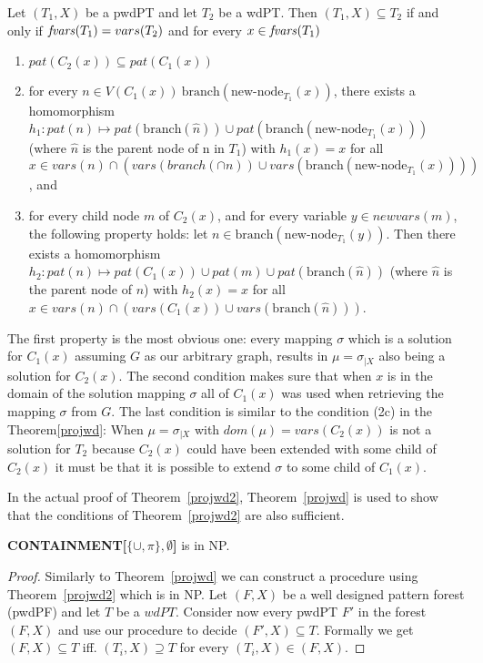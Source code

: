 \begin{theorem}\label{projwd2}
	Let $(T_1,X)$ be a pwdPT and let $T_2$ be a wdPT. Then $(T_1,X) \subseteq
	T_2$ if and only if $\mathit{fvars}(T_1) = vars(T_2)$ and for every $x \in
	\mathit{fvars}(T_1)$
	\begin{enumerate}
		\item $pat(C_2(x)) \subseteq pat(C_1(x))$
		\item for every $n \in V(C_1(x)) \ \mbox{branch} (\mbox{new-node}_{T_1}(x))$, there
			exists a homomorphism $h_1: pat(n) \mapsto pat(\mbox{branch}(\hat{n})) \cup
			pat(\mbox{branch}(\mbox{new-node}_{T_1}(x)))$ (where $\hat{n}$ is the parent node
			of n in $T_1$) with $h_1(x) = x$ for all $x \in vars(n) \cap
			(vars(branch(\cap{n})) \cup vars(\mbox{branch}(\mbox{new-node}_{T_1}(x))))$, and
		\item for every child node $m$ of $C_2(x)$, and for every variable $y
			\in newvars(m)$, the following property holds: let $n \in
			\mbox{branch}(\mbox{new-node}_{T_1}(y))$. Then there exists a homomorphism
			$h_2:pat(n) \mapsto pat(C_1(x)) \cup pat(m) \cup
			pat(\mbox{branch}(\hat{n}))$ (where $\hat{n}$ is the parent node of $n$)
			with $h_2(x) = x$ for all $x \in vars(n) \cap (vars(C_1(x)) \cup
			vars(\mbox{branch}(\hat{n})))$.
	\end{enumerate}
\end{theorem}
\begin{proofidea}
	The first property is the most obvious one: every mapping $\sigma$ which is
	a solution for $C_1(x)$ assuming $G$ as our arbitrary graph, results in $\mu =
	\sigma_{|X}$ also being a solution for $C_2(x)$.
	The second condition makes sure that when $x$ is in the domain of the
	solution mapping $\sigma$ all of $C_1(x)$ was used when retrieving the
	mapping $\sigma$ from $G$.
	The last condition is similar to the condition (2c) in the
	Theorem\ref{projwd}: When $\mu = \sigma_{|X}$ with $dom(\mu) =
	vars(C_2(x))$ is not a solution for $T_2$ because $C_2(x)$ could have been
	extended with some child of $C_2(x)$ it must be that it is possible to
	extend $\sigma$ to some child of $C_1(x)$.
\end{proofidea}

In the actual proof of Theorem~\ref{projwd2}, Theorem~\ref{projwd} is used to show
that the conditions of Theorem~\ref{projwd2} are also sufficient.

\begin{theorem}\label{ccuppiempty}
	\textbf{CONTAINMENT[$\{\cup,\pi\},\emptyset$]} is in NP.
\end{theorem}
\begin{proof}
	Similarly to Theorem~\ref{projwd} we can construct a procedure using Theorem~\ref{projwd2} 
	which is in NP.
	Let $(F,X)$ be a well designed pattern forest (pwdPF) and let $T$ be a
	$wdPT$. Consider now every pwdPT $F'$ in the forest $(F,X)$ and
	use our procedure to decide $(F',X) \subseteq T$. Formally we get $(F,X) \subseteq T$ iff.
	$(T_i,X) \supseteq T$ for every $(T_i,X) \in (F,X)$.
\end{proof}

